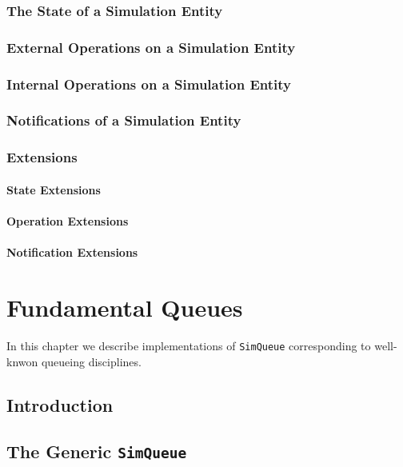 \documentclass[12pt]{book}
\begin{document}
\subsection{The State of a Simulation Entity}

\subsection{External Operations on a Simulation Entity}

\subsection{Internal Operations on a Simulation Entity}

\subsection{Notifications of a Simulation Entity}

\subsection{Extensions}

\subsubsection{State Extensions}

\subsubsection{Operation Extensions}

\subsubsection{Notification Extensions}

\chapter{Fundamental Queues}

In this chapter we describe implementations of \lstinline|SimQueue| corresponding
  to well-knwon queueing disciplines.

\section{Introduction}

\section{The Generic \lstinline{SimQueue}}
\label{simqueue-generic}
\end{document}
